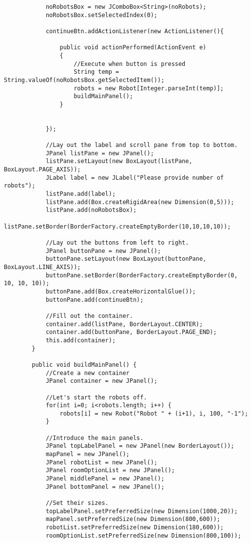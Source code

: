 \begin{lstlisting}
			noRobotsBox = new JComboBox<String>(noRobots);
			noRobotsBox.setSelectedIndex(0);

			continueBtn.addActionListener(new ActionListener(){

				public void actionPerformed(ActionEvent e)
	            {
	                //Execute when button is pressed
	            	String temp = String.valueOf(noRobotsBox.getSelectedItem());
	            	robots = new Robot[Integer.parseInt(temp)];
	                buildMainPanel();
	            }


			});
			
			//Lay out the label and scroll pane from top to bottom.
			JPanel listPane = new JPanel();
			listPane.setLayout(new BoxLayout(listPane, BoxLayout.PAGE_AXIS));
			JLabel label = new JLabel("Please provide number of robots");
			listPane.add(label);
			listPane.add(Box.createRigidArea(new Dimension(0,5)));
			listPane.add(noRobotsBox);
			listPane.setBorder(BorderFactory.createEmptyBorder(10,10,10,10));

			//Lay out the buttons from left to right.
			JPanel buttonPane = new JPanel();
			buttonPane.setLayout(new BoxLayout(buttonPane, BoxLayout.LINE_AXIS));
			buttonPane.setBorder(BorderFactory.createEmptyBorder(0, 10, 10, 10));
			buttonPane.add(Box.createHorizontalGlue());
			buttonPane.add(continueBtn);

			//Fill out the container.
			container.add(listPane, BorderLayout.CENTER);
			container.add(buttonPane, BorderLayout.PAGE_END);
			this.add(container);
		}

		public void buildMainPanel() {
			//Create a new container
			JPanel container = new JPanel();
			
			//Let's start the robots off.
			for(int i=0; i<robots.length; i++) {
				robots[i] = new Robot("Robot " + (i+1), i, 100, "-1");
			}

			//Introduce the main panels.
			JPanel topLabelPanel = new JPanel(new BorderLayout());
			mapPanel = new JPanel();
			JPanel robotList = new JPanel();
			JPanel roomOptionList = new JPanel();
			JPanel middlePanel = new JPanel();
			JPanel bottomPanel = new JPanel();

			//Set their sizes.
			topLabelPanel.setPreferredSize(new Dimension(1000,20));
			mapPanel.setPreferredSize(new Dimension(800,600));
			robotList.setPreferredSize(new Dimension(180,600));
			roomOptionList.setPreferredSize(new Dimension(800,100));


\end{lstlisting}
